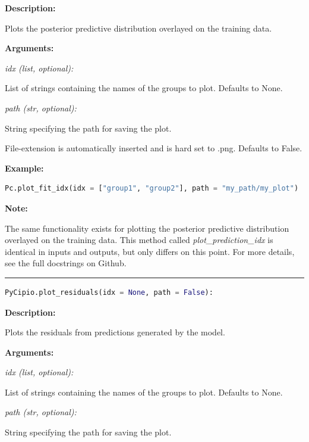 \documentclass{article}
\begin{document}
\indent \textbf{Description:} 

\indent \indent Plots the posterior predictive distribution overlayed on the training data.

\indent \textbf{Arguments:}

\indent \indent \textit{idx (list, optional):} 

\indent \indent \indent List of strings containing the names of the groups to plot. Defaults to None.

\indent \indent \textit{path (str, optional):}

\indent \indent \indent String specifying the path for saving the plot. 

\indent \indent \indent File-extension is automatically inserted and is hard set to .png. Defaults to False.

\indent \textbf{Example:}

\begin{lstlisting}[language=Python]
        Pc.plot_fit_idx(idx = ["group1", "group2"], path = "my_path/my_plot")
\end{lstlisting}

\noindent \textbf{Note:}

\noindent The same functionality exists for plotting the posterior predictive distribution overlayed on the training data. This method called \textit{plot\_prediction\_idx} is identical in inputs and outputs, but only differs on this point. For more details, see the full docstrings on Github. 


\hrule

\begin{lstlisting}[language=Python]
    PyCipio.plot_residuals(idx = None, path = False):
\end{lstlisting}

\indent \textbf{Description:} 

\indent \indent Plots the residuals from predictions generated by the model.

\indent \textbf{Arguments:}

\indent \indent \textit{idx (list, optional):}

\indent \indent \indent List of strings containing the names of the groups to plot. Defaults to None.

\indent \indent \textit{path (str, optional):}

\indent \indent \indent String specifying the path for saving the plot. 
\end{document}
